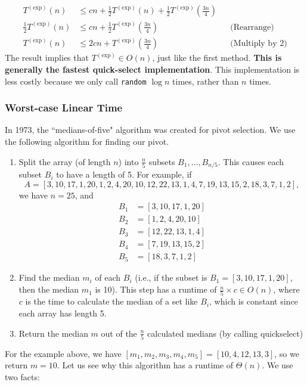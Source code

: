 \documentclass{report}
\begin{document}
\begin{align*}
T^{(\mathrm{exp})}(n) &\leq cn+ \frac{1}{2}T^{(\mathrm{exp})}(n) + \frac{1}{2}T^{(\mathrm{exp})}\left(\frac{3n}{4}\right) \\
\frac{1}{2} T^{(\mathrm{exp})}(n) &\leq cn + \frac{1}{2}T^{(\mathrm{exp})}\left(\frac{3n}{4}\right) && \text{(Rearrange)}\\
T^{(\mathrm{exp})}(n) &\leq 2cn + T^{(\mathrm{exp})}\left(\frac{3n}{4}\right) && \text{(Multiply by 2)}
\end{align*}
The result implies that $T^{(\mathrm{exp})} \in O(n)$, just like the first method. \textbf{This is generally the fastest quick-select implementation}. This implementation is less costly because we only call \texttt{random} $\log n$ times, rather than $n$ times.
\subsubsection{Worst-case Linear Time}
In 1973, the ``medians-of-five" algorithm was created for pivot selection. We use the following 
algorithm for finding our pivot.
\begin{enumerate}
\item Split the array (of length $n$) into $\frac{n}{5}$ subsets $B_1,\dots,B_{n/5}$. This causes each subset $B_i$ to have a length of 5.
  For example, if 
$$A=[3,10,17,1,20,1,2,4,20,10,12,22,13,1,4,7,19,13,15,2,18,3,7,1,2],$$
we have $n=25$, and 
\begin{align*}
  B_1&=[3,10,17,1,20] \\
  B_2&=[1,2,4,20,10] \\
  B_3&=[12,22,13,1,4] \\
  B_4&=[7,19,13,15,2] \\
  B_5&=[18,3,7,1,2]
\end{align*}
\item Find the median $m_i$ of each $B_i$ (i.e., if the subset is $B_1 = [3, 10, 17, 1, 20]$, then the median $m_1$ is 10). This step has a runtime of $\frac{n}{5} \times c \in O(n)$, where $c$ is the time to calculate the median of a set like $B_i$, which is constant since each array has length 5.
\item Return the median $m$ out of the $\frac{n}{5}$ calculated medians (by calling quickselect)
\end{enumerate}
For the example above, we have $[m_1,m_2,m_3,m_4,m_5] =
[10,4,12,13,3]$, so we return $m=10$. 
Let us see why this algorithm has a runtime of $\Theta(n)$. We use two facts:
\end{document}
